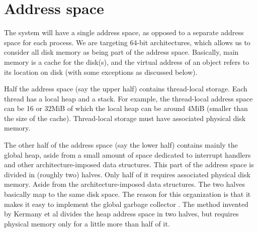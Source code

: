 \chapter{Address space}

The system will have a single address space, as opposed to a separate
address space for each process.  We are targeting 64-bit
architectures, which allows us to consider all disk memory as being
part of the address space.  Basically, main memory is a cache for the
disk(s), and the virtual address of an object refers to its location
on disk (with some exceptions as discussed below).

Half the address space (say the upper half) contains thread-local
storage.  Each thread has a local heap and a stack.  For example, the
thread-local address space can be 16 or 32MiB of which the local heap
can be around 4MiB (smaller than the size of the cache).  Thread-local
storage must have associated physical disk memory. 

The other half of the address space (say the lower half) contains
mainly the global heap, aside from a small amount of space dedicated
to interrupt handlers and other architecture-imposed data structures.
This part of the address space is divided in (roughly two) halves.
Only half of it requires associated physical disk memory.  Aside from
the architecture-imposed data structures. The two halves basically map
to the same disk space.  The reason for this organization is that it
makes it easy to implement the global garbage collector
.  The method invented by Kermany et
al \cite{Kermany:2006:CCI:1133981.1134023} divides the heap address
space in two halves, but requires physical memory only for a little
more than half of it. 

